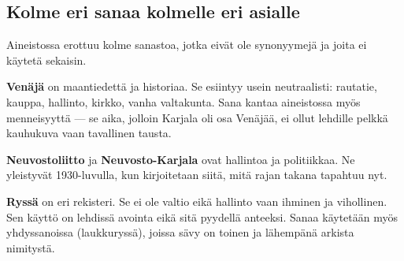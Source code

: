 \documentclass[10pt,a4paper]{article}
\begin{document}
\subsection{Kolme eri sanaa kolmelle eri asialle}

Aineistossa erottuu kolme sanastoa, jotka eivät ole synonyymejä ja joita ei käytetä
sekaisin.

\textbf{Venäjä} on maantiedettä ja historiaa. Se esiintyy usein neutraalisti:
rautatie, kauppa, hallinto, kirkko, vanha valtakunta. Sana kantaa aineistossa myös
menneisyyttä --- se aika, jolloin Karjala oli osa Venäjää, ei ollut lehdille pelkkä
kauhukuva vaan tavallinen tausta.

\textbf{Neuvostoliitto} ja \textbf{Neuvosto-Karjala} ovat hallintoa ja politiikkaa.
Ne yleistyvät 1930-luvulla, kun kirjoitetaan siitä, mitä rajan takana tapahtuu nyt.

\textbf{Ryssä} on eri rekisteri. Se ei ole valtio eikä hallinto vaan ihminen ja
vihollinen. Sen käyttö on lehdissä avointa eikä sitä pyydellä anteeksi. Sanaa käytetään
myös yhdyssanoissa (laukkuryssä), joissa sävy on toinen ja lähempänä arkista
nimitystä.
\end{document}
